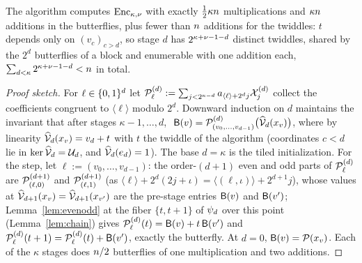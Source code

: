 \begin{center}
\end{center}

\begin{proposition}\label{prop:ntt}
The algorithm computes $\mathrm{Enc}_{\kappa,\nu}$ with exactly $\tfrac12 \kappa n$ multiplications and $\kappa n$ additions in the butterflies, plus fewer than $n$ additions for the twiddles: $t$ depends only on $(v_c)_{c > d}$, so stage $d$ has $2^{\kappa + \nu - 1 - d}$ distinct twiddles, shared by the $2^{d}$ butterflies of a block and enumerable with one addition each, $\sum_{d < \kappa} 2^{\kappa + \nu - 1 - d} < n$ in total.
\end{proposition}

\begin{proof}[Proof sketch]
For $\ell \in \{0,1\}^{d}$ let $\mathcal{P}^{(d)}_{\ell} := \sum_{j < 2^{\kappa-d}} a_{\langle \ell \rangle + 2^d j} \mathcal{X}^{(d)}_j$ collect the coefficients congruent to $\langle \ell \rangle$ modulo $2^d$. Downward induction on $d$ maintains the invariant that after stages $\kappa-1, \dots, d$, $\ \mathsf{B}(v) = \mathcal{P}^{(d)}_{(v_0,\dots,v_{d-1})}\bigl(\widehat{\mathcal{V}}_{d}(x_v)\bigr)$, where by linearity $\widehat{\mathcal{V}}_{d}(x_v) = v_d + t$ with $t$ the twiddle of the algorithm (coordinates $c < d$ lie in $\ker \widehat{\mathcal{V}}_{d} = \mathcal{U}_d$, and $\widehat{\mathcal{V}}_{d}(e_d) = 1$). The base $d = \kappa$ is the tiled initialization. For the step, let $\ell := (v_0, \dots, v_{d-1})$: the order-$(d{+}1)$ even and odd parts of $\mathcal{P}^{(d)}_{\ell}$ are $\mathcal{P}^{(d+1)}_{(\ell,0)}$ and $\mathcal{P}^{(d+1)}_{(\ell,1)}$ (as $\langle \ell \rangle + 2^d(2j+\iota) = \langle (\ell,\iota) \rangle + 2^{d+1} j$), whose values at $\widehat{\mathcal{V}}_{d+1}(x_v) = \widehat{\mathcal{V}}_{d+1}(x_{v'})$ are the pre-stage entries $\mathsf{B}(v)$ and $\mathsf{B}(v')$; Lemma~\ref{lem:evenodd} at the fiber $\{t, t+1\}$ of $\psi_d$ over this point (Lemma~\ref{lem:chain}) gives $\mathcal{P}^{(d)}_{\ell}(t) = \mathsf{B}(v) + t\,\mathsf{B}(v')$ and $\mathcal{P}^{(d)}_{\ell}(t+1) = \mathcal{P}^{(d)}_{\ell}(t) + \mathsf{B}(v')$, exactly the butterfly. At $d = 0$, $\mathsf{B}(v) = \mathcal{P}(x_v)$. Each of the $\kappa$ stages does $n/2$ butterflies of one multiplication and two additions.
\end{proof}

